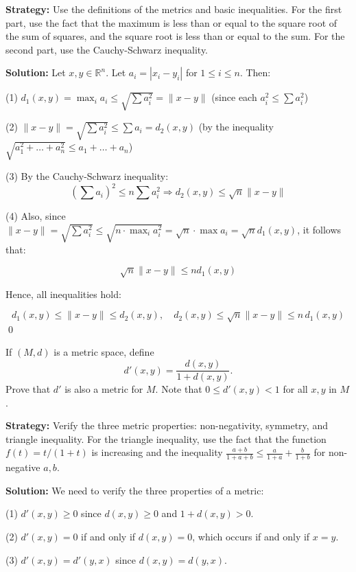 \noindent\textbf{Strategy:} Use the definitions of the metrics and basic inequalities. For the first part, use the fact that the maximum is less than or equal to the square root of the sum of squares, and the square root is less than or equal to the sum. For the second part, use the Cauchy-Schwarz inequality.

\bigskip\noindent\textbf{Solution:} Let $x, y \in \mathbb{R}^n$. Let $a_i = |x_i - y_i|$ for $1 \leq i \leq n$. Then:

(1) \( d_1(x, y) = \max_i a_i \leq \sqrt{\sum a_i^2} = \|x - y\| \) (since each $a_i^2 \leq \sum a_i^2$)

(2) \( \|x - y\| = \sqrt{\sum a_i^2} \leq \sum a_i = d_2(x,y) \) (by the inequality \( \sqrt{a_1^2 + \dots + a_n^2} \leq a_1 + \dots + a_n \))

(3) By the Cauchy-Schwarz inequality:
\[
\left(\sum a_i\right)^2 \leq n \sum a_i^2 \Rightarrow d_2(x,y) \leq \sqrt{n} \|x - y\|
\]

(4) Also, since \( \|x - y\| = \sqrt{\sum a_i^2} \leq \sqrt{n \cdot \max_i a_i^2} = \sqrt{n} \cdot \max a_i = \sqrt{n} d_1(x, y) \), it follows that:

\[
\sqrt{n} \|x - y\| \leq n d_1(x, y)
\]

Hence, all inequalities hold:

\[
d_1(x,y) \leq \|x - y\| \leq d_2(x,y), \quad d_2(x, y) \leq \sqrt{n} \|x - y\| \leq n\,d_1(x, y)
\]\qed


\begin{problembox}
If \( (M, d) \) is a metric space, define
\[d'(x, y) = \frac{d(x, y)}{1 + d(x, y)}.\]
Prove that \( d' \) is also a metric for \( M \). Note that \( 0 \leq d'(x, y) < 1 \) for all \( x, y \) in \( M \).
\end{problembox}

\noindent\textbf{Strategy:} Verify the three metric properties: non-negativity, symmetry, and triangle inequality. For the triangle inequality, use the fact that the function $f(t) = t/(1+t)$ is increasing and the inequality $\frac{a+b}{1+a+b} \leq \frac{a}{1+a} + \frac{b}{1+b}$ for non-negative $a,b$.

\bigskip\noindent\textbf{Solution:} We need to verify the three properties of a metric:

(1) $d'(x,y) \geq 0$ since $d(x,y) \geq 0$ and $1 + d(x,y) > 0$.

(2) $d'(x,y) = 0$ if and only if $d(x,y) = 0$, which occurs if and only if $x = y$.

(3) $d'(x,y) = d'(y,x)$ since $d(x,y) = d(y,x)$.

